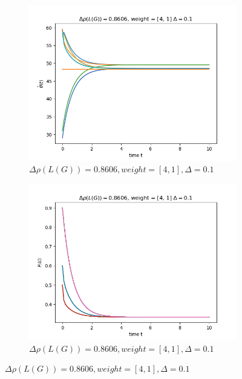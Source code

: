 \documentclass{article}
\begin{document}
\begin{problem}
\begin{figure}[!h]
\begin{subfigure}{0.4\textwidth}
            \includegraphics[width=\textwidth]{./img/Figure_6.png}
            \caption{$\Delta \rho (L(G)) = 0.8606, weight = [4,1], \Delta = 0.1$}
        \end{subfigure}
        \begin{subfigure}{0.4\textwidth}
            \includegraphics[width=\textwidth]{./img/Figure_7.png}
            \caption{$\Delta \rho (L(G)) = 0.8606, weight = [4,1], \Delta = 0.1$}
        \end{subfigure}


\end{figure}
\end{problem}
\end{document}
